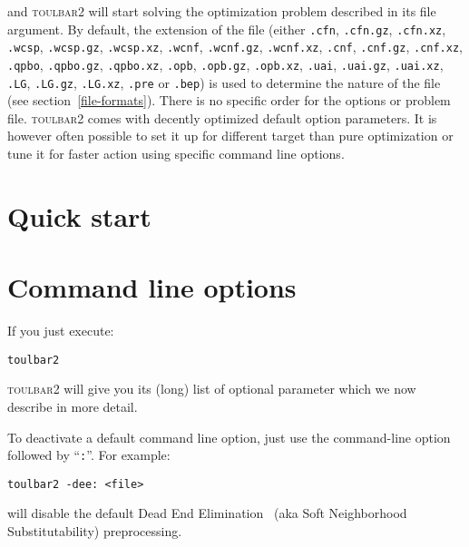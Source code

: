 \documentclass{article}
\def\toulbar2{\textsc{toulbar2}}
\begin{document}
and \toulbar2 will start solving the optimization problem described in
its file argument. By default, the extension of the file (either
\texttt{.cfn}, \texttt{.cfn.gz}, \texttt{.cfn.xz}, \texttt{.wcsp}, \texttt{.wcsp.gz}, \texttt{.wcsp.xz},
\texttt{.wcnf}, \texttt{.wcnf.gz}, \texttt{.wcnf.xz}, \texttt{.cnf}, \texttt{.cnf.gz}, \texttt{.cnf.xz}, \texttt{.qpbo}, \texttt{.qpbo.gz}, \texttt{.qpbo.xz}, \texttt{.opb}, \texttt{.opb.gz}, \texttt{.opb.xz},
\texttt{.uai}, \texttt{.uai.gz}, \texttt{.uai.xz}, \texttt{.LG}, \texttt{.LG.gz}, \texttt{.LG.xz}, \texttt{.pre} or \texttt{.bep}) is used
to determine the nature of the file (see
section~\ref{file-formats}). There is no specific order for the
options or problem file. \toulbar2 comes with decently optimized
default option parameters. It is however often possible to set it up
for different target than pure optimization or tune it for faster
action using specific command line options.

\section{Quick start}
\label{quickstart}



\section{Command line options}

If you just execute:

\begin{verbatim}
toulbar2
\end{verbatim}

\toulbar2 will give you its (long) list of optional parameter which we
now describe in more detail. 


To deactivate a default command line option, just use the
command-line option followed by ``\texttt{:}''. For example:

\begin{verbatim}
toulbar2 -dee: <file>
\end{verbatim}

will disable the default Dead End Elimination~\cite{Givry13a} (aka Soft Neighborhood
Substitutability) preprocessing.
\end{document}
